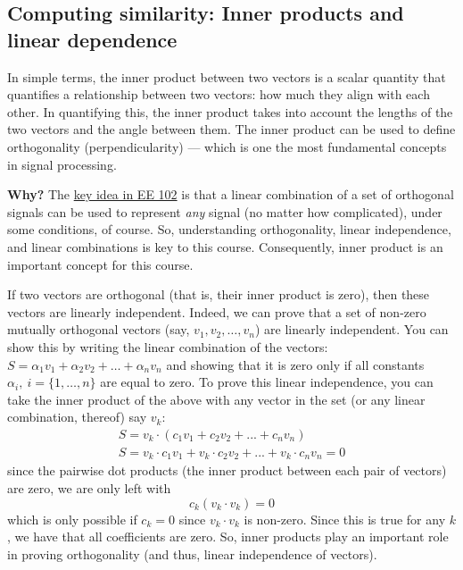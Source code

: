 \subsection{Computing similarity: Inner products and linear dependence}
In simple terms, the inner product between two vectors is a scalar quantity that quantifies a relationship between two vectors: how much they align with each other. In quantifying this, the inner product takes into account the lengths of the two vectors and the angle between them. The inner product can be used to define orthogonality (perpendicularity) --- which is one the most fundamental concepts in signal processing.

\textbf{Why?} The \ul{key idea in EE 102} is that a linear combination of a set of orthogonal signals can be used to represent \textit{any} signal (no matter how complicated), under some conditions, of course. So, understanding orthogonality, linear independence, and linear combinations is key to this course. Consequently, inner product is an important concept for this course.

If two vectors are orthogonal (that is, their inner product is zero), then these vectors are linearly independent. Indeed, we can prove that a set of non-zero mutually orthogonal vectors (say, $v_1, v_2, \ldots, v_n$) are linearly independent. You can show this by writing the linear combination of the vectors: $
S = \alpha_1 v_1 + \alpha_2 v_2 + \ldots + \alpha_n v_n$ and showing that it is zero only if all constants $\alpha_i, \: i = \{1, \ldots, n\}$ are equal to zero. To prove this linear independence, you can take the inner product of the above with any vector in the set (or any linear combination, thereof) say $v_k$:
\begin{align*}
S = v_k \cdot (c_1v_1 + c_2v_2 + ... + c_nv_n)\\
S = v_k \cdot c_1v_1 + v_k \cdot c_2v_2 + ... + v_k \cdot c_nv_n = 0
\end{align*}
since the pairwise dot products (the inner product between each pair of vectors) are zero, we are only left with
\[
c_k (v_k \cdot v_k) = 0
\]
which is only possible if $c_k = 0$ since $v_k \cdot v_k$ is non-zero. Since this is true for any $k$, we have that all coefficients are zero. So, inner products play an important role in proving orthogonality (and thus, linear independence of vectors). 

